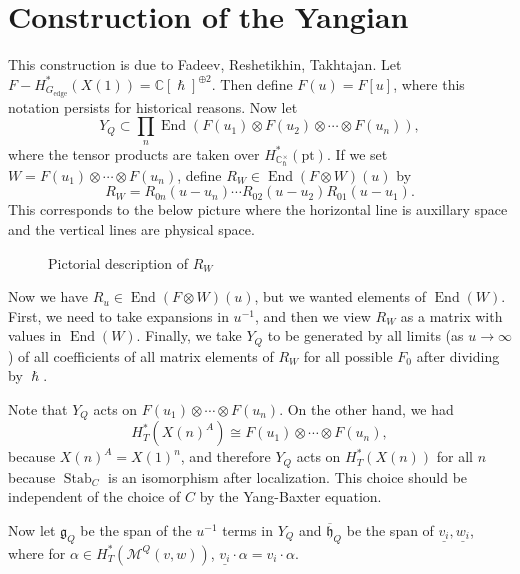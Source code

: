 \documentclass[leqno, openany]{memoir}
\theoremstyle{definition}
\theoremstyle{remark}
\theoremstyle{plain}
\theoremstyle{definition}
\theoremstyle{remark}
\newcommand{\C}{\mathbb{C}}
\newcommand{\mc}[1]{\mathcal{#1}}
\newcommand{\mf}[1]{\mathfrak{#1}}
\newcommand{\mr}[1]{\mathrm{#1}}
\newcommand{\on}[1]{\operatorname{#1}}
\newcommand{\ol}[1]{\overline{#1}}
\newcommand{\ul}[1]{\underline{#1}}
\DeclareMathOperator{\End}{End}
\begin{document}
\section{Construction of the Yangian}

This construction is due to Fadeev, Reshetikhin, Takhtajan. Let $F - H^*_{G_{\mr{edge}}}(X(1)) = \C[\hslash]^{\oplus 2}$. Then define $F(u) = F[u]$, where this notation persists for historical reasons. Now let
\[ Y_Q \subset \prod_n \End(F(u_1) \otimes F(u_2) \otimes \cdots \otimes F(u_n)), \]
where the tensor products are taken over $H^*_{\C_{\hslash}^{\times}}(\mr{pt})$. If we set $W = F(u_1) \otimes \cdots \otimes F(u_n)$, define $R_W \in \End(F \otimes W)(u)$ by
\[ R_W = R_{0n}(u-u_n) \cdots R_{02}(u-u_2) R_{01}(u-u_1). \]
This corresponds to the below picture where the horizontal line is auxillary space and the vertical lines are physical space.
\begin{figure}[H]
\begin{center}
\end{center}
\caption{Pictorial description of $R_W$}%
\label{fig:}
\end{figure}

Now we have $R_u \in \End(F \otimes W)(u)$, but we wanted elements of $\End(W)$. First, we need to take expansions in $u^{-1}$, and then we view $R_W$ as a matrix with values in $\End(W)$. Finally, we take $Y_Q$ to be generated by all limits (as $u \to \infty$) of all coefficients of all matrix elements of $R_W$ for all possible $F_0$ after dividing by $\hslash$.

Note that $Y_Q$ acts on $F(u_1) \otimes \cdots \otimes F(u_n)$. On the other hand, we had
\[ H_T^*(X(n)^A) \cong F(u_1) \otimes \cdots \otimes F(u_n), \]
because $X(n)^A = X(1)^n$, and therefore $Y_Q$ acts on $H_T^* (X(n))$ for all $n$ because $\on{Stab}_C$ is an isomorphism after localization. This choice should be independent of the choice of $C$ by the Yang-Baxter equation.

Now let $\mf{g}_Q$ be the span of the $u^{-1}$ terms in $Y_Q$ and $\ol{\mf{h}}_Q$ be the span of $\ul{v_i}, \ul{w_i}$, where for $\alpha \in H_T^*(\mc{M}^Q(v, w))$, $\ul{v_i} \cdot \alpha = v_i \cdot \alpha$.
\end{document}
